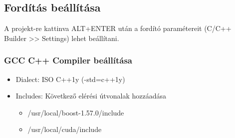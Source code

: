 
\subsection*{Fordítás beállítása}
	A projekt-re kattinva ALT+ENTER után a fordító paramétereit (C/C++ Builder >> Settings) lehet beállítani.
\subsubsection*{GCC C++ Compiler beállítása}
	\begin{itemize}[noitemsep]
		\item Dialect: ISO C++1y (-std=c++1y)
		\item Includes: Következő elérési útvonalak hozzáadása
			\begin{itemize}
				\item /usr/local/boost-1.57.0/include
				\item /usr/local/cuda/include
			\end{itemize}
	\end{itemize}


